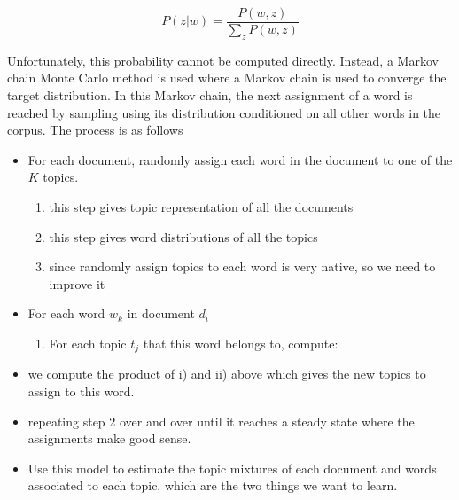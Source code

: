 \documentclass{article} %
\begin{document}
\begin{equation}
P(z|w) = \frac{P(w,z)}{\sum_{z}P(w,z)}
\end{equation}

Unfortunately, this probability cannot be computed directly. Instead, a Markov chain Monte Carlo method is used where a Markov chain is used to converge the target distribution. In this Markov chain, the next assignment of a word is reached by sampling using its distribution conditioned on all other words in the corpus. The process is as follows
\begin{itemize}
\item For each document, randomly assign each word in the document to one of the $K$ topics.
\begin{enumerate}
\item this step gives topic representation of all the documents
\item this step gives word distributions of all the topics
\item since randomly assign topics to each word is very native, so we need to improve it
\end{enumerate}
\item For each word $w_k$ in document $d_i$
\begin{enumerate}
\item For each topic $t_j$ that this word belongs to, compute:


\end{enumerate}
\item we compute the product of i) and ii) above which gives the new topics to assign to this word.
\item repeating step 2 over and over until it reaches a steady state where the assignments make good sense.
\item Use this model to estimate the topic mixtures of each document and words associated to each topic, which are the two things we want to learn.
\end{itemize}
\end{document}
